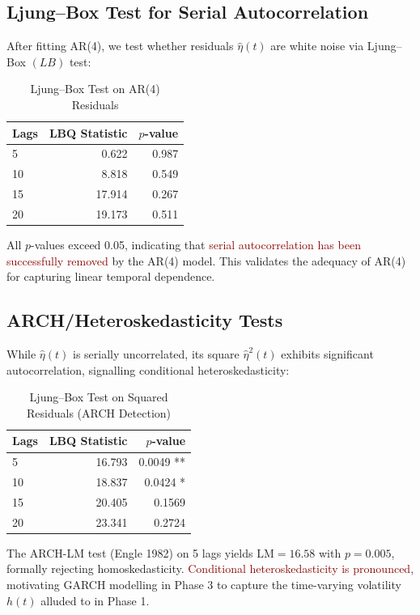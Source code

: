 \documentclass[11pt]{article}
\newcommand{\alert}[1]{\textcolor{darkred}{#1}}
\begin{document}
\subsection{Ljung--Box Test for Serial Autocorrelation}

After fitting AR(4), we test whether residuals $\widehat{\eta}(t)$ are white noise via Ljung--Box $(LB)$ test:

\begin{table}[h]
\centering
\caption{Ljung--Box Test on AR(4) Residuals}
\label{tab:lb_residuals}
\begin{tabular}{lrr}
\toprule
\textbf{Lags} & \textbf{LBQ Statistic} & \textbf{$p$-value} \\
\midrule
5 & 0.622 & 0.987 \\
10 & 8.818 & 0.549 \\
15 & 17.914 & 0.267 \\
20 & 19.173 & 0.511 \\
\bottomrule
\end{tabular}
\end{table}

All $p$-values exceed 0.05, indicating that \alert{serial autocorrelation has been successfully removed} by the AR(4) model. This validates the adequacy of AR(4) for capturing linear temporal dependence.

\subsection{ARCH/Heteroskedasticity Tests}

While $\widehat{\eta}(t)$ is serially uncorrelated, its square $\widehat{\eta}^2(t)$ exhibits significant autocorrelation, signalling conditional heteroskedasticity:

\begin{table}[h]
\centering
\caption{Ljung--Box Test on Squared Residuals (ARCH Detection)}
\label{tab:lb_squared}
\begin{tabular}{lrr}
\toprule
\textbf{Lags} & \textbf{LBQ Statistic} & \textbf{$p$-value} \\
\midrule
5 & 16.793 & 0.0049 ** \\
10 & 18.837 & 0.0424 * \\
15 & 20.405 & 0.1569 \\
20 & 23.341 & 0.2724 \\
\bottomrule
\end{tabular}
\end{table}

The ARCH-LM test (Engle 1982) on 5 lags yields $\text{LM} = 16.58$ with $p = 0.005$, formally rejecting homoskedasticity. \alert{Conditional heteroskedasticity is pronounced}, motivating GARCH modelling in Phase 3 to capture the time-varying volatility $h(t)$ alluded to in Phase 1.
\end{document}
